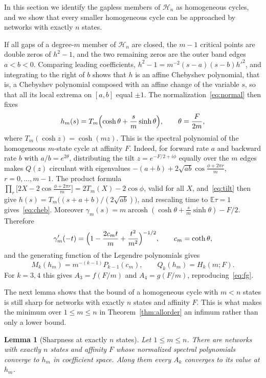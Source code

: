 \documentclass[11pt]{article}
\newtheorem{lemma}[theorem]{Lemma}
\theoremstyle{remark}
\newcommand{\HH}{\mathcal H}
\newcommand{\E}{\mathbb E}
\newcommand{\acosh}{\operatorname{arcosh}}
\begin{document}
In this section we identify the gapless members of $\HH_n$ as homogeneous
cycles, and we show that every smaller homogeneous cycle can be approached
by networks with exactly $n$ states.

If all gaps of a degree-$m$ member of $\HH_n$ are closed, the $m-1$ critical
points are double zeros of $h^2-1$, and the two remaining zeros are the outer
band edges $a<b<0$. Comparing leading coefficients,
$h^2-1=m^{-2}(s-a)(s-b)h'^2$, and integrating to the right of $b$ shows that
$h$ is an affine Chebyshev polynomial, that is, a Chebyshev polynomial
composed with an affine change of the variable $s$, so that all its local
extrema on $[a,b]$ equal $\pm1$. The normalization~\eqref{eq:normal}
then fixes
\begin{equation}\label{eq:cheb}
h_m(s)=T_m\Bigl(\cosh\theta+\frac sm\sinh\theta\Bigr),\qquad
\theta=\frac F{2m},
\end{equation}
where $T_m(\cosh z)=\cosh(mz)$. This is the spectral polynomial of the
homogeneous $m$-state cycle at affinity $F$. Indeed, for forward rate $a$
and backward rate $b$ with $a/b=e^{2\theta}$, distributing the tilt
$z=e^{-F/2+i\phi}$ equally over the $m$ edges makes $Q(z)$ circulant with
eigenvalues $-(a+b)+2\sqrt{ab}\cos\frac{\phi+2\pi r}m$, $r=0,\dots,m-1$.
The product formula
$\prod_r\bigl[2X-2\cos\frac{\phi+2\pi r}m\bigr]=2T_m(X)-2\cos\phi$,
valid for all $X$, and~\eqref{eq:tilt} then give $h(s)=T_m\bigl((s+a+b)/(2\sqrt{ab})\bigr)$,
and rescaling time to $\E\tau=1$ gives~\eqref{eq:cheb}. Moreover
$\gamma_m(s)=m\acosh(\cosh\theta+\frac sm\sinh\theta)-F/2$. Therefore
\[
\gamma_m'(-t)=\Bigl(1-\frac{2c_mt}m+\frac{t^2}{m^2}\Bigr)^{-1/2},\qquad
c_m=\coth\theta,
\]
and the generating function of the Legendre polynomials gives
\begin{equation}\label{eq:homM}
M_k(h_m)=m^{-(k-1)}P_{k-1}(c_m),\qquad
Q_k(h_m)=H_k(m;F).
\end{equation}
For $k=3,4$ this gives $A_3=f(F/m)$ and $A_4=g(F/m)$,
reproducing~\eqref{eq:fg}.

The next lemma shows that the bound of a homogeneous cycle with $m<n$
states is still sharp for networks with exactly $n$ states and affinity
$F$. This is what makes the minimum over $1\le m\le n$ in
Theorem~\ref{thm:allorder} an infimum rather than only a lower bound.

\begin{lemma}[Sharpness at exactly $n$ states]\label{lem:sharp}
Let $1\le m\le n$. There are networks with exactly $n$ states and affinity
$F$ whose normalized spectral polynomials converge to $h_m$ in coefficient
space. Along them every $A_k$ converges to its value at $h_m$.
\end{lemma}
\end{document}
